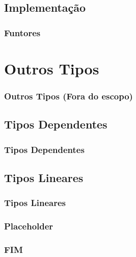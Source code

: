 \documentclass{beamer}
\begin{document}
\subsection{Implementação}
\begin{frame}
    \frametitle{Funtores}
\end{frame}

\section{Outros Tipos}
\begin{frame}
    \frametitle{Outros Tipos (Fora do escopo)}
\end{frame}

\subsection{Tipos Dependentes}
\begin{frame}
    \frametitle{Tipos Dependentes}
\end{frame}

\subsection{Tipos Lineares}
\begin{frame}
    \frametitle{Tipos Lineares}
\end{frame}

\begin{frame}
    \frametitle{Placeholder}
\end{frame}

\begin{frame}
    \frametitle{FIM}
\end{frame}
\end{document}
